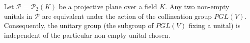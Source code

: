 Let $\mathcal{P} = \mathcal{P}_2(K)$ be a projective plane over a field $K$. Any two non-empty unitals in $\mathcal{P}$ are equivalent under the action of the collineation group $PGL(V)$. Consequently, the unitary group (the subgroup of $PGL(V)$ fixing a unital) is independent of the particular non-empty unital chosen.
